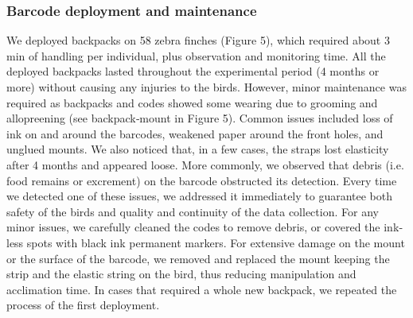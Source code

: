 \documentclass[11pt,a4paper,oneside]{article}
\begin{document}
\subsubsection{Barcode deployment and maintenance}
We deployed backpacks on 58 zebra finches (Figure 5), which required about 3 min of handling per individual, plus observation and monitoring time. All the deployed backpacks lasted throughout the experimental period (4 months or more) without causing any injuries to the birds. However, minor maintenance was required as backpacks and codes showed some wearing due to grooming and allopreening (see backpack‐mount in Figure 5). Common issues included loss of ink on and around the barcodes, weakened paper around the front holes, and unglued mounts. We also noticed that, in a few cases, the straps lost elasticity after 4 months and appeared loose. More commonly, we observed that debris (i.e. food remains or excrement) on the barcode obstructed its detection. Every time we detected one of these issues, we addressed it immediately to guarantee both safety of the birds and quality and continuity of the data collection. For any minor issues, we carefully cleaned the codes to remove debris, or covered the ink‐less spots with black ink permanent markers. For extensive damage on the mount or the surface of the barcode, we removed and replaced the mount keeping the strip and the elastic string on the bird, thus reducing manipulation and acclimation time. In cases that required a whole new backpack, we repeated the process of the first deployment.
\end{document}
